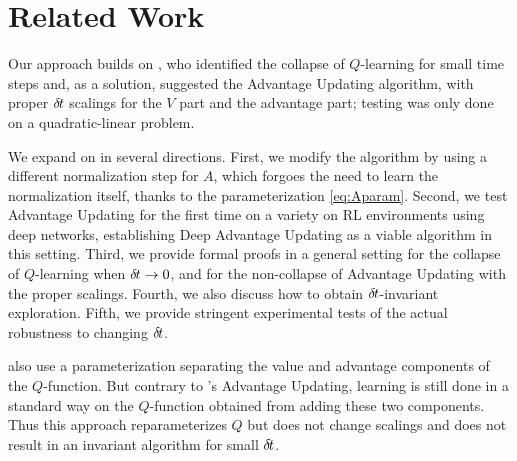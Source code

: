 \section{Related Work}
\label{sec:related}

Our approach builds on \cite{adv_upd},  who identified the collapse of
$Q$-learning for small time steps and, as a solution, suggested the Advantage
Updating algorithm, with proper ${\delta\hspace{-.1em}t}$ scalings for the $V$ part and
the advantage part; testing was only done on a quadratic-linear problem.

We expand on \cite{adv_upd} in several directions. First, we modify the
algorithm by
using a different normalization step for $A$, which forgoes the need to
learn the normalization itself, thanks to the parameterization
\eqref{eq:Aparam}. Second, we test Advantage Updating for the first time on a
variety on RL environments using deep networks, establishing Deep
Advantage Updating as a viable algorithm in this setting.  Third,
we provide formal proofs in a general setting for the collapse of $Q$-learning when ${\delta\hspace{-.1em}t}\to
0$, and for the non-collapse of Advantage Updating with the proper scalings.
Fourth, we also discuss how to obtain ${\delta\hspace{-.1em}t}$-invariant exploration. Fifth, we
provide stringent experimental tests of the actual robustness to changing
${\delta\hspace{-.1em}t}$.


\cite{dueling_nets} also use a parameterization separating
the value and advantage components of the $Q$-function. But contrary to
\cite{adv_upd}'s Advantage Updating, learning is still done in a standard
way on the $Q$-function obtained from adding these two components. Thus this
approach reparameterizes $Q$ but does not change scalings
and does not result in an invariant algorithm for small ${\delta\hspace{-.1em}t}$.%

